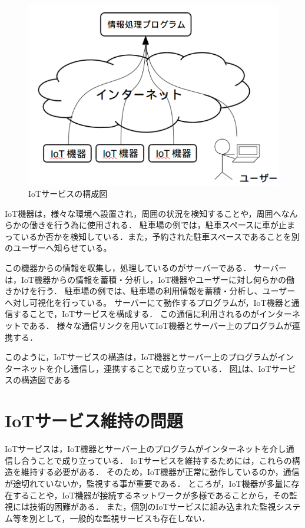 \begin{figure}[htbp]
\includegraphics[width=14cm]{images/IoTservice.png}
\caption{IoTサービスの構成図}
\label{fig:IoTservice}
\end{figure}

IoT機器は，様々な環境へ設置され，周囲の状況を検知することや，周囲へなんらかの働きを行う為に使用される．
駐車場の例では，駐車スペースに車が止まっているか否かを検知している．また，予約された駐車スペースであることを別のユーザーへ知らせている。
\medskip

この機器からの情報を収集し，処理しているのがサーバーである．
サーバーは，IoT機器からの情報を蓄積・分析し，IoT機器やユーザーに対し何らかの働きかけを行う．
駐車場の例では、駐車場の利用情報を蓄積・分析し、ユーザーへ対し可視化を行っている。
サーバーにて動作するプログラムが，IoT機器と通信することで，IoTサービスを構成する．
この通信に利用されるのがインターネットである．
様々な通信リンクを用いてIoT機器とサーバー上のプログラムが連携する．
\medskip

このように，IoTサービスの構造は，IoT機器とサーバー上のプログラムがインターネットを介し通信し，連携することで成り立っている．
図\ref{fig:IoTservice}は、IoTサービスの構造図である

\section{IoTサービス維持の問題}
IoTサービスは，IoT機器とサーバー上のプログラムがインターネットを介し通信し合うことで成り立っている．
IoTサービスを維持するためには，これらの構造を維持する必要がある．
そのため，IoT機器が正常に動作しているのか，通信が途切れていないか，監視する事が重要である．
ところが，IoT機器が多量に存在することや，IoT機器が接続するネットワークが多様であることから，その監視には技術的困難がある．
また，個別のIoTサービスに組み込まれた監視システム等を別として，一般的な監視サービスも存在しない．
\medskip

